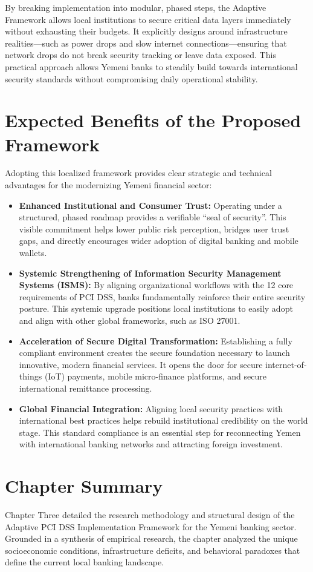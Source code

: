 \documentclass[12pt,a4paper,oneside]{report}
\begin{document}
	By breaking implementation into modular, phased steps, the Adaptive Framework allows local institutions to secure critical data layers immediately without exhausting their budgets. It explicitly designs around infrastructure realities—such as power drops and slow internet connections—ensuring that network drops do not break security tracking or leave data exposed. This practical approach allows Yemeni banks to steadily build towards international security standards without compromising daily operational stability.
	
	\section{Expected Benefits of the Proposed Framework}
	Adopting this localized framework provides clear strategic and technical advantages for the modernizing Yemeni financial sector:
	\begin{itemize}
		\item \textbf{Enhanced Institutional and Consumer Trust:} Operating under a structured, phased roadmap provides a verifiable ``seal of security''. This visible commitment helps lower public risk perception, bridges user trust gaps, and directly encourages wider adoption of digital banking and mobile wallets.
		\item \textbf{Systemic Strengthening of Information Security Management Systems (ISMS):} By aligning organizational workflows with the 12 core requirements of PCI DSS, banks fundamentally reinforce their entire security posture. This systemic upgrade positions local institutions to easily adopt and align with other global frameworks, such as ISO 27001.
		\item \textbf{Acceleration of Secure Digital Transformation:} Establishing a fully compliant environment creates the secure foundation necessary to launch innovative, modern financial services. It opens the door for secure internet-of-things (IoT) payments, mobile micro-finance platforms, and secure international remittance processing.
		\item \textbf{Global Financial Integration:} Aligning local security practices with international best practices helps rebuild institutional credibility on the world stage. This standard compliance is an essential step for reconnecting Yemen with international banking networks and attracting foreign investment.
	\end{itemize}
	
	\section{Chapter Summary}
	Chapter Three detailed the research methodology and structural design of the Adaptive PCI DSS Implementation Framework for the Yemeni banking sector. Grounded in a synthesis of empirical research, the chapter analyzed the unique socioeconomic conditions, infrastructure deficits, and behavioral paradoxes that define the current local banking landscape. 
	
\end{document}
